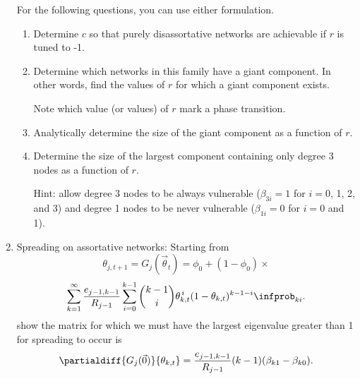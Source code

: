 \begin{enumerate}
  For the following questions, you can use either formulation.
  
  \begin{enumerate}
  \item 
    Determine $c$ so that purely disassortative networks
    are achievable if $r$ is tuned to -1.

    
   \solutionstart


   \solutionend

  \item
    Determine which networks in this family have a giant component.
    In other words, find the values of $r$ for which a giant component
    exists.  

    Note which value (or values) of $r$ mark a phase transition.

    
   \solutionstart


   \solutionend

  \item
    Analytically determine the size of the giant component
    as a function of $r$.

    
   \solutionstart


   \solutionend

  \item
    Determine the size of the largest component
    containing only degree 3 nodes as a function of $r$.

    Hint: allow degree 3 nodes to be always vulnerable
    ($\beta_{3i}=1$ for $i=0$, 1, 2, and 3)
    and degree 1 nodes to be never vulnerable
    ($\beta_{1i}=0$ for $i=0$ and 1).

    
   \solutionstart


   \solutionend

  \end{enumerate}


\item
  Spreading on assortative networks:
  Starting from
  $$
  \theta_{j,t+1}
  =
  G_{j}(\vec{\theta}_{t})
  =
  \phi_{0} + 
  (1-\phi_{0}) \times
  $$
  $$
  \sum_{k=1}^{\infty}
  \frac{e_{j-1,k-1}}{R_{j-1}}
  \sum_{i=0}^{k-1}
  \binom{k-1}{i}
  \theta_{k,t}^{\, i}
  (1-\theta_{k,t})^{k-1-i}
  \infprob_{ki}.
  $$
  show the matrix for which we must have
  the largest eigenvalue greater than 1 for
  spreading to occur is
  $$
  \partialdiff{G_{j}(\vec{0})}{\theta_{k,t}} 
  = 
  \frac{e_{j-1,k-1}}{R_{j-1}}
  (k-1)
  (\beta_{k1} - \beta_{k0}).
  $$


\end{enumerate}
